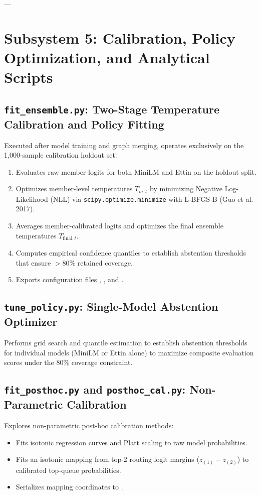 \documentclass[11pt,a4paper]{article}
\begin{document}
---

\section{Subsystem 5: Calibration, Policy Optimization, and Analytical Scripts}

\subsection{\texttt{fit\_ensemble.py}: Two-Stage Temperature Calibration and Policy Fitting}
Executed after model training and graph merging,  operates exclusively on the 1,000-sample calibration holdout set:
\begin{enumerate}
  \item Evaluates raw member logits for both MiniLM and Ettin on the holdout split.
  \item Optimizes member-level temperatures $T_{m, t}$ by minimizing Negative Log-Likelihood (NLL) via \texttt{scipy.optimize.minimize} with L-BFGS-B (Guo et al. 2017).
  \item Averages member-calibrated logits and optimizes the final ensemble temperatures $T_{\text{final}, t}$.
  \item Computes empirical confidence quantiles to establish abstention thresholds that ensure $> 80\%$ retained coverage.
  \item Exports configuration files , , and .
\end{enumerate}

\subsection{\texttt{tune\_policy.py}: Single-Model Abstention Optimizer}
Performs grid search and quantile estimation to establish abstention thresholds for individual models (MiniLM or Ettin alone) to maximize composite evaluation scores under the 80\% coverage constraint.

\subsection{\texttt{fit\_posthoc.py} and \texttt{posthoc\_cal.py}: Non-Parametric Calibration}
Explores non-parametric post-hoc calibration methods:
\begin{itemize}
  \item Fits isotonic regression curves and Platt scaling to raw model probabilities.
  \item Fits an isotonic mapping from top-2 routing logit margins ($z_{(1)} - z_{(2)}$) to calibrated top-queue probabilities.
  \item Serializes mapping coordinates to .
\end{itemize}
\end{document}
